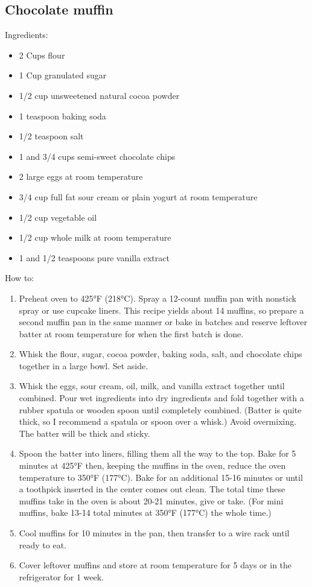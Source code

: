 \documentclass[a4paper, 12pt]{article}
\begin{document}
\subsection{Chocolate muffin}

Ingredients:

\begin{itemize}
	\item 2 Cups flour
	\item 1 Cup granulated sugar
	\item 1/2 cup unsweetened natural cocoa powder
	\item 1 teaspoon baking soda
	\item 1/2 teaspoon salt
	\item 1 and 3/4 cups semi-sweet chocolate chips
	\item 2 large eggs at room temperature
	\item 3/4 cup full fat sour cream or plain yogurt at room temperature
	\item 1/2 cup vegetable oil
	\item 1/2 cup whole milk at room temperature
	\item 1 and 1/2 teaspoons pure vanilla extract
\end{itemize}

How to:

\begin{enumerate}
	\item Preheat oven to 425°F (218°C). Spray a 12-count muffin pan with nonstick spray or use cupcake liners. This recipe yields about 14 muffins, so prepare a second muffin pan in the same manner or bake in batches and reserve leftover batter at room temperature for when the first batch is done.
	
	\item Whisk the flour, sugar, cocoa powder, baking soda, salt, and chocolate chips together in a large bowl. Set aside.
	
	\item Whisk the eggs, sour cream, oil, milk, and vanilla extract together until combined. Pour wet ingredients into dry ingredients and fold together with a rubber spatula or wooden spoon until completely combined. (Batter is quite thick, so I recommend a spatula or spoon over a whisk.) Avoid overmixing. The batter will be thick and sticky.
	
	\item Spoon the batter into liners, filling them all the way to the top. Bake for 5 minutes at 425°F then, keeping the muffins in the oven, reduce the oven temperature to 350°F (177°C). Bake for an additional 15-16 minutes or until a toothpick inserted in the center comes out clean. The total time these muffins take in the oven is about 20-21 minutes, give or take. (For mini muffins, bake 13-14 total minutes at 350°F (177°C) the whole time.)
	
	\item Cool muffins for 10 minutes in the pan, then transfer to a wire rack until ready to eat.
	
	\item Cover leftover muffins and store at room temperature for 5 days or in the refrigerator for 1 week.
\end{enumerate}
\end{document}
